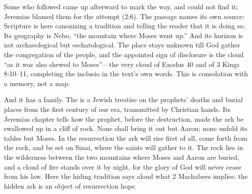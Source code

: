Some who followed came up afterward to mark the way, and could not find
it; Jeremias blamed them for the attempt (2:6). The passage names its own
source: Scripture is here canonizing a tradition and telling the reader
that it is doing so. Its geography is Nebo, ``the mountain where Moses went
up.'' And its horizon is not archaeological but eschatological. The place
stays unknown till God gather the congregation of the people, and the
appointed sign of disclosure is the cloud ``as it was also shewed to
Moses''---the very cloud of Exodus 40 and of 3 Kings 8:10--11, completing
the inclusio in the text's own words. This is consolation with a memory,
not a map.

And it has a family. The  is a Jewish treatise
on the prophets' deaths and burial places from the first century of our
era, transmitted by Christian hands. Its Jeremias chapter tells how the
prophet, before the destruction, made the ark be swallowed up in a cliff of
rock. None shall bring it out but Aaron; none unfold its tables but Moses.
In the resurrection the ark will rise first of all, come forth from the
rock, and be set on Sinai, where the saints will gather to it. The rock
lies in the wilderness between the two mountains where Moses and Aaron are
buried, and a cloud of fire stands over it by night, for the glory of God
will never cease from his law. Here the hiding tradition says aloud what
2 Machabees implies: the hidden ark is an object of resurrection
hope.

